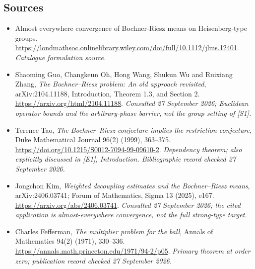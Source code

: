 \documentclass[11pt,a4paper]{article}
\numberwithin{equation}{section}
\begin{document}
\subsection{Sources}
\begin{itemize}\raggedright
\item[\textnormal{[S1]}]\hypertarget{source:180:1}{} Almost everywhere convergence of Bochner-Riesz means on Heisenberg-type groups.
\url{https://londmathsoc.onlinelibrary.wiley.com/doi/full/10.1112/jlms.12401}.
{\small\textit{Catalogue formulation source.}}
\item[\textnormal{[E1]}]\hypertarget{extra:180:1}{} Shaoming Guo, Changkeun
Oh, Hong Wang, Shukun Wu and Ruixiang Zhang, \emph{The Bochner--Riesz problem:
An old approach revisited}, arXiv:2104.11188, Introduction, Theorem 1.3,
and Section 2. \url{https://arxiv.org/html/2104.11188}.
{\small\textit{Consulted 27 September 2026; Euclidean operator bounds and
the arbitrary-phase barrier, not the group setting of [S1].}}
\item[\textnormal{[E2]}]\hypertarget{extra:180:2}{} Terence Tao,
\emph{The Bochner--Riesz conjecture implies the restriction conjecture},
Duke Mathematical Journal 96(2) (1999), 363--375.
\url{https://doi.org/10.1215/S0012-7094-99-09610-2}.
{\small\textit{Dependency theorem; also explicitly discussed in [E1],
Introduction. Bibliographic record checked 27 September 2026.}}
\item[\textnormal{[E3]}]\hypertarget{extra:180:3}{} Jongchon Kim,
\emph{Weighted decoupling estimates and the Bochner--Riesz means},
arXiv:2406.03741; Forum of Mathematics, Sigma 13 (2025), e167.
\url{https://arxiv.org/abs/2406.03741}.
{\small\textit{Consulted 27 September 2026; the cited application is
almost-everywhere convergence, not the full strong-type target.}}
\item[\textnormal{[E4]}]\hypertarget{extra:180:4}{} Charles Fefferman,
\emph{The multiplier problem for the ball}, Annals of Mathematics 94(2)
(1971), 330--336. \url{https://annals.math.princeton.edu/1971/94-2/p05}.
{\small\textit{Primary theorem at order zero; publication record checked
27 September 2026.}}
\end{itemize}
\end{document}
